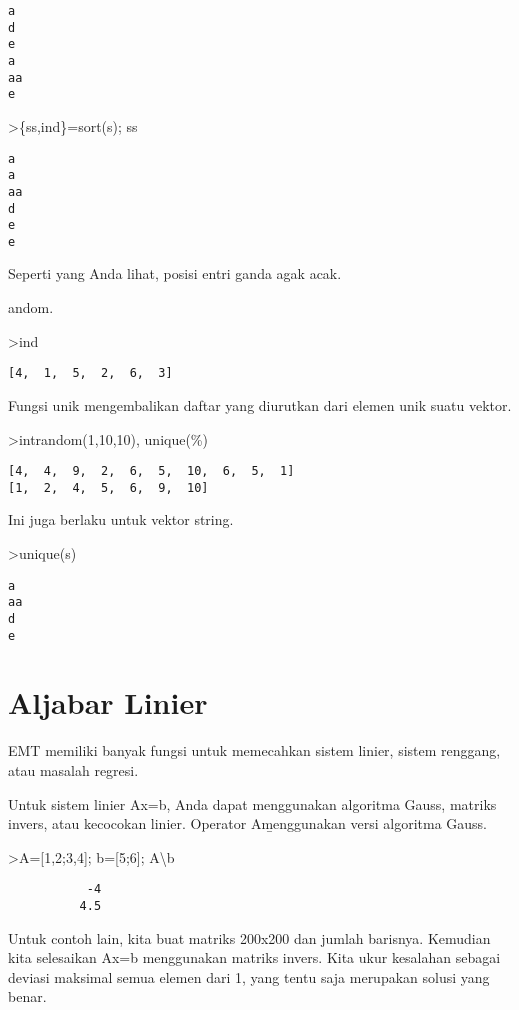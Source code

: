 \documentclass[
]{book}
\begin{document}
\begin{verbatim}
a
d
e
a
aa
e
\end{verbatim}

\textgreater\{ss,ind\}=sort(s); ss

\begin{verbatim}
a
a
aa
d
e
e
\end{verbatim}

Seperti yang Anda lihat, posisi entri ganda agak acak.

andom.

\textgreater ind

\begin{verbatim}
[4,  1,  5,  2,  6,  3]
\end{verbatim}

Fungsi unik mengembalikan daftar yang diurutkan dari elemen unik suatu vektor.

\textgreater intrandom(1,10,10), unique(\%)

\begin{verbatim}
[4,  4,  9,  2,  6,  5,  10,  6,  5,  1]
[1,  2,  4,  5,  6,  9,  10]
\end{verbatim}

Ini juga berlaku untuk vektor string.

\textgreater unique(s)

\begin{verbatim}
a
aa
d
e
\end{verbatim}

\chapter{Aljabar Linier}\label{aljabar-linier}

EMT memiliki banyak fungsi untuk memecahkan sistem linier, sistem renggang, atau masalah regresi.

Untuk sistem linier Ax=b, Anda dapat menggunakan algoritma Gauss, matriks invers, atau kecocokan linier. Operator A\b menggunakan versi algoritma Gauss.

\textgreater A={[}1,2;3,4{]}; b={[}5;6{]}; A\textbackslash b

\begin{verbatim}
           -4 
          4.5 
\end{verbatim}

Untuk contoh lain, kita buat matriks 200x200 dan jumlah barisnya. Kemudian kita selesaikan Ax=b menggunakan matriks invers. Kita ukur kesalahan sebagai deviasi maksimal semua elemen dari 1, yang tentu saja merupakan solusi yang benar.
\end{document}
